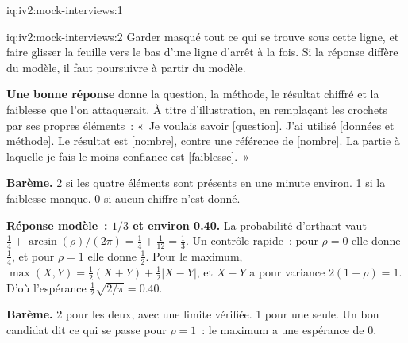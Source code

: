 \begin{solution}{iq:iv2:mock-interviews:1}
\end{solution}

\begin{solution}{iq:iv2:mock-interviews:2}
Garder masqué tout ce qui se trouve sous cette ligne, et faire glisser la feuille vers le bas d'une ligne d'arrêt à la fois. Si la réponse diffère du modèle, il faut poursuivre à partir du modèle.

\ivstop
\textbf{Une bonne réponse} donne la question, la méthode, le résultat chiffré et la faiblesse que l'on attaquerait. À titre d'illustration, en remplaçant les crochets par ses propres éléments~: «~Je voulais savoir [question]. J'ai utilisé [données et méthode]. Le résultat est [nombre], contre une référence de [nombre]. La partie à laquelle je fais le moins confiance est [faiblesse].~»

\textbf{Barème.} 2 si les quatre éléments sont présents en une minute environ. 1 si la faiblesse manque. 0 si aucun chiffre n'est donné.

\ivstop
\textbf{Réponse modèle~: $1/3$ et environ 0.40.} La probabilité d'orthant vaut $\tfrac14 + \arcsin(\rho)/(2\pi) = \tfrac14 + \tfrac{1}{12} = \tfrac13$. Un contrôle rapide~: pour $\rho = 0$ elle donne $\tfrac14$, et pour $\rho = 1$ elle donne $\tfrac12$. Pour le maximum, $\max(X, Y) = \tfrac12(X + Y) + \tfrac12|X - Y|$, et $X - Y$ a pour variance $2(1 - \rho) = 1$. D'où l'espérance $\tfrac12\sqrt{2/\pi} = 0.40$.

\textbf{Barème.} 2 pour les deux, avec une limite vérifiée. 1 pour une seule. Un bon candidat dit ce qui se passe pour $\rho = 1$~: le maximum a une espérance de 0.


\end{solution}

